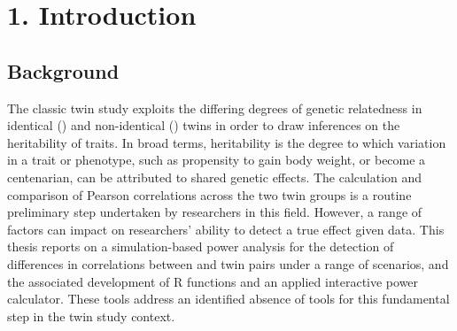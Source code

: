 \chapter*{1. Introduction}
\setcounter{chapter}{1}

			

\large


\section{Background}

The classic twin study exploits the differing degrees of genetic relatedness in identical (\mz) and non-identical (\dz) twins in order to draw inferences on the heritability of traits.  In broad terms, heritability is the degree to which variation in a trait or phenotype, such as propensity to gain body weight, or become a centenarian, can be attributed to shared genetic effects.  The calculation and comparison of Pearson correlations across the two twin groups is a routine preliminary step undertaken by researchers in this field.  However, a range of factors can impact on researchers' ability to detect a true effect given data.  
This thesis reports on a simulation-based power analysis for the detection of differences in correlations between \mz and \dz twin pairs under a range of scenarios, and the associated development of R functions and an applied interactive power calculator.  These tools address an identified absence of tools for this fundamental step in the twin study context.
 
